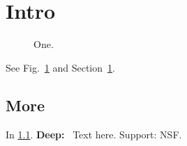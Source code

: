 \documentclass{emulateapj}
\newcommand{\fig}[1]{Fig.~\ref{#1}}
\newcommand{\subsubsubsection}[1]{\textbf{#1:}~}
\newcommand{\supportfrom}[1]{Support: #1}
\begin{document}
\section{Intro}\label{s:i}
\begin{figure}\caption{One.}\label{f1}\end{figure}
See \fig{f1} and Section~\ref{s:i}.
\subsection{More}\label{s:m}
In \ref{s:m}.
\subsubsubsection{Deep} Text here. \supportfrom{NSF}.
\end{document}
